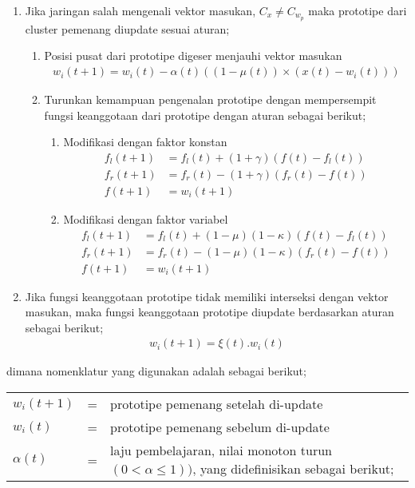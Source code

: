 \begin{enumerate}
  \item Jika jaringan salah mengenali vektor masukan, $C_x \neq C_{w_p}$ maka
  prototipe dari cluster pemenang diupdate sesuai aturan;
  \begin{enumerate}
    \item Posisi pusat dari prototipe digeser menjauhi vektor masukan
  	\begin{align}
  	w_i(t+1) = w_i(t) - \alpha(t) \left((1-\mu(t))\times(x(t) - w_i(t))  \right)
  	\end{align}
  	\item Turunkan kemampuan pengenalan prototipe dengan mempersempit fungsi
  	keanggotaan dari prototipe dengan aturan sebagai berikut;
  	\begin{enumerate}
  	  \item Modifikasi dengan faktor konstan
  	  \begin{align}
  	  f_l(t+1) &= f_l(t) + (1+\gamma) (f(t) - f_l(t)) \\
  	  f_r(t+1) &= f_r(t) - (1+\gamma) (f_r(t) - f(t)) \nonumber \\
  	  f(t+1)   &= w_i(t+1) \nonumber 
  	  \end{align}
  	  
  	  \item Modifikasi dengan faktor variabel
	  \begin{align}
  	  f_l(t+1) &= f_l(t) + (1 - \mu)(1-\kappa)(f(t) - f_l(t)) \\
  	  f_r(t+1) &= f_r(t) - (1 - \mu)(1-\kappa)(f_r(t) - f(t)) \nonumber \\
  	  f(t+1)   &= w_i(t+1) \nonumber
  	  \end{align}  	  
  	\end{enumerate}
  \end{enumerate}
  
  \item Jika fungsi keanggotaan prototipe tidak memiliki interseksi dengan
  vektor masukan, maka fungsi keanggotaan prototipe diupdate berdasarkan aturan
  sebagai berikut;
  \begin{align}
  w_i(t+1) = \xi(t).w_i(t)
  \end{align}
\end{enumerate}

\noindent dimana nomenklatur yang digunakan adalah sebagai berikut;

\begin{tabular}{llp{}}
$w_{i}(t+1)$ &=& prototipe pemenang setelah di-update  \\
$w_{i}(t)$ 	 &=& prototipe pemenang sebelum di-update \\
$\alpha(t)$  &=& laju pembelajaran, nilai monoton turun $(0 < \alpha \le 1))$,
 yang didefinisikan sebagai berikut;
\end{tabular}

